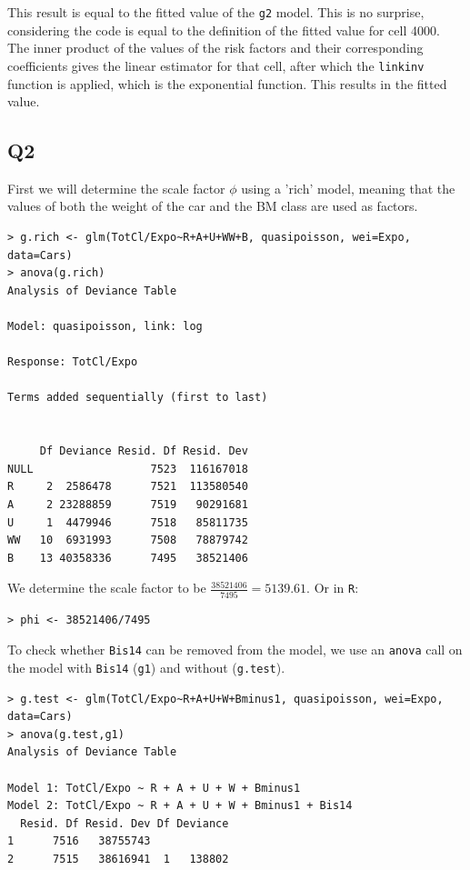 \documentclass[11pt]{article}
\begin{document}
This result is equal to the fitted value of the \verb|g2| model. This is no surprise, considering the code is equal to the definition of the fitted value for cell 4000. The inner product of the values of the risk factors and their corresponding coefficients gives the linear estimator for that cell, after which the \verb|linkinv| function is applied, which is the exponential function. This results in the fitted value.

\subsection*{Q2}

First we will determine the scale factor $\phi$ using a 'rich' model, meaning that the values of both the weight of the car and the BM class are used as factors.

\begin{verbatim}
> g.rich <- glm(TotCl/Expo~R+A+U+WW+B, quasipoisson, wei=Expo, data=Cars)
> anova(g.rich)
Analysis of Deviance Table

Model: quasipoisson, link: log

Response: TotCl/Expo

Terms added sequentially (first to last)


     Df Deviance Resid. Df Resid. Dev
NULL                  7523  116167018
R     2  2586478      7521  113580540
A     2 23288859      7519   90291681
U     1  4479946      7518   85811735
WW   10  6931993      7508   78879742
B    13 40358336      7495   38521406
\end{verbatim}

We determine the scale factor to be $\frac{38521406}{7495} = 5139.61$. Or in \verb|R|:

\begin{verbatim}
> phi <- 38521406/7495
\end{verbatim}

To check whether \verb|Bis14| can be removed from the model, we use an \verb|anova| call on the model with \verb|Bis14| (\verb|g1|) and without (\verb|g.test|).

\begin{verbatim}
> g.test <- glm(TotCl/Expo~R+A+U+W+Bminus1, quasipoisson, wei=Expo, data=Cars)
> anova(g.test,g1)
Analysis of Deviance Table

Model 1: TotCl/Expo ~ R + A + U + W + Bminus1
Model 2: TotCl/Expo ~ R + A + U + W + Bminus1 + Bis14
  Resid. Df Resid. Dev Df Deviance
1      7516   38755743            
2      7515   38616941  1   138802
\end{verbatim} 
\end{document}
